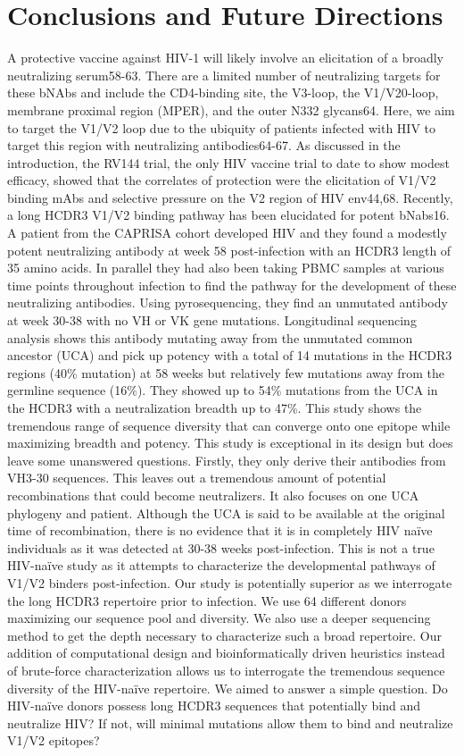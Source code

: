\section{Conclusions and Future Directions}
A protective vaccine against HIV-1 will likely involve an elicitation of a broadly neutralizing serum58-63. There are a limited number of neutralizing targets for these bNAbs and include the CD4-binding site, the V3-loop, the V1/V20-loop, membrane proximal region (MPER), and the outer N332 glycans64. Here, we aim to target the V1/V2 loop due to the ubiquity of patients infected with HIV to target this region with neutralizing antibodies64-67. As discussed in the introduction, the RV144 trial, the only HIV vaccine trial to date to show modest efficacy, showed that the correlates of protection were the elicitation of V1/V2 binding mAbs and selective pressure on the V2 region of HIV env44,68.
Recently, a long HCDR3 V1/V2 binding pathway has been elucidated for potent bNabs16. A patient from the CAPRISA cohort developed HIV and they found a modestly potent neutralizing antibody at week 58 post-infection with an HCDR3 length of 35 amino acids. In parallel they had also been taking PBMC samples at various time points throughout infection to find the pathway for the development of these neutralizing antibodies. Using pyrosequencing, they find an unmutated antibody at week 30-38 with no VH or VK gene mutations. Longitudinal sequencing analysis shows this antibody mutating away from the unmutated common ancestor (UCA) and pick up potency with a total of 14 mutations in the HCDR3 regions (40\% mutation) at 58 weeks but relatively few mutations away from the germline sequence (16\%). They showed up to 54\% mutations from the UCA in the HCDR3 with a neutralization breadth up to 47\%. This study shows the tremendous range of sequence diversity that can converge onto one epitope while maximizing breadth and potency. This study is exceptional in its design but does leave some unanswered questions. Firstly, they only derive their antibodies from VH3-30 sequences. This leaves out a tremendous amount of potential recombinations that could become neutralizers. It also focuses on one UCA phylogeny and patient. Although the UCA is said to be available at the original time of recombination, there is no evidence that it is in completely HIV naïve individuals as it was detected at 30-38 weeks post-infection. This is not a true HIV-naïve study as it attempts to characterize the developmental pathways of V1/V2 binders post-infection.
Our study is potentially superior as we interrogate the long HCDR3 repertoire prior to infection. We use 64 different donors maximizing our sequence pool and diversity. We also use a deeper sequencing method to get the depth necessary to characterize such a broad repertoire. Our addition of computational design and bioinformatically driven heuristics instead of brute-force characterization allows us to interrogate the tremendous sequence diversity of the HIV-naïve repertoire. We aimed to answer a simple question. Do HIV-naïve donors possess long HCDR3 sequences that potentially bind and neutralize HIV? If not, will minimal mutations allow them to bind and neutralize V1/V2 epitopes?
